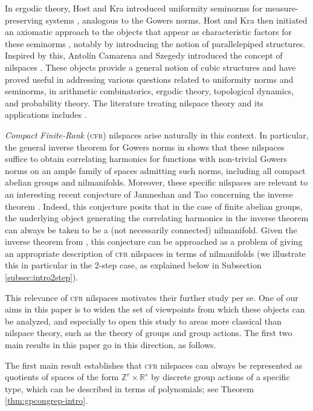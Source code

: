 \documentclass[a4paper,12pt,reqno]{amsart}
\theoremstyle{definition}
\newcommand{\mb}{\mathbb}
\begin{document}
In ergodic theory, Host and Kra introduced uniformity seminorms for measure-preserving systems \cite{HK-non-conv}, analogous to the Gowers norms. Host and Kra then  initiated an axiomatic approach to the objects that appear as characteristic factors for these seminorms  \cite{HK-par}, notably by introducing the notion of parallelepiped structures. Inspired by this, Antolín Camarena and Szegedy introduced the concept of nilspaces \cite{CamSzeg}. These objects provide a general notion of cubic structures and have proved useful in addressing various questions related to uniformity norms and seminorms, in arithmetic combinatorics, ergodic theory, topological dynamics, and probability theory. The literature treating nilspace theory and its applications includes \cite{Cand:Notes1,CGSS, CScouplings, CSinverse, GMV1, GMV2, GMV3}.

\emph{Compact Finite-Rank}  (\textsc{cfr}) nilspaces arise naturally in this context. In particular, the general inverse theorem for Gowers norms in \cite{CSinverse} shows that these nilspaces suffice to obtain correlating harmonics for functions with non-trivial Gowers norms on an ample family of spaces admitting such norms, including all compact abelian groups and nilmanifolds. Moreover, these specific nilspaces are relevant to an interesting recent conjecture of Jamneshan and Tao concerning the inverse theorem \cite[Conjecture 1.11]{J&T}. Indeed, this conjecture posits that in the case of finite abelian groups, the underlying object generating the correlating harmonics in the inverse theorem can always be taken to be a (not necessarily connected) nilmanifold. Given the inverse theorem from \cite{CSinverse}, this conjecture can be approached as a problem of giving an appropriate description of \textsc{cfr} nilspaces in terms of nilmanifolds (we illustrate this in particular in the 2-step case, as explained below in Subsection \ref{subsec:intro2step}).

This relevance of \textsc{cfr} nilspaces motivates their further study per se. One of our aims in this paper is to widen the set of viewpoints from which these objects can be analyzed, and especially to open this study to areas more classical than nilspace theory, such as the theory of groups and group actions. The first two main results in this paper go in this direction, as follows. 

The first main result establishes that \textsc{cfr} nilspaces can always be represented as quotients of spaces of the form $\mb{Z}^{r}\times \mb{R}^s$ by discrete group actions of a specific type, which can be described in terms of polynomials; see Theorem \ref{thm:gpcongrep-intro}. 
\end{document}
